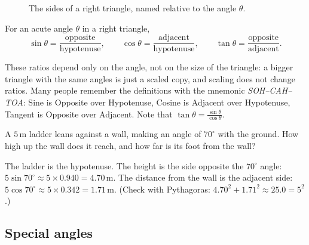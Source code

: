 \begin{figure}[htbp]
\centering
{}
\caption{The sides of a right triangle, named relative to the angle $\theta$.}
\label{fig:right-triangle}
\end{figure}

\begin{definition}\label{def:trig-triangle}
For an acute angle $\theta$ in a right triangle,
\[
  \sin\theta = \frac{\text{opposite}}{\text{hypotenuse}}, \qquad
  \cos\theta = \frac{\text{adjacent}}{\text{hypotenuse}}, \qquad
  \tan\theta = \frac{\text{opposite}}{\text{adjacent}} .
\]
\end{definition}

These ratios depend only on the angle, not on the size of the triangle: a
bigger triangle with the same angles is just a scaled copy, and scaling does
not change ratios. Many people remember the definitions with the mnemonic
\emph{SOH--CAH--TOA}: Sine is Opposite over Hypotenuse, Cosine is Adjacent
over Hypotenuse, Tangent is Opposite over Adjacent. Note that
$\tan\theta = \frac{\sin\theta}{\cos\theta}$.

\begin{example}\label{ex:ladder}
A $5$\,m ladder leans against a wall, making an angle of $70^\circ$ with the
ground. How high up the wall does it reach, and how far is its foot from the
wall?

\sol The ladder is the hypotenuse. The height is the side opposite the
$70^\circ$ angle: $5\sin 70^\circ \approx 5 \times 0.940 = 4.70$\,m. The
distance from the wall is the adjacent side: $5\cos70^\circ \approx 5 \times
0.342 = 1.71$\,m. (Check with Pythagoras: $4.70^2 + 1.71^2 \approx 25.0 =
5^2$.)
\end{example}

\subsection{Special angles}

